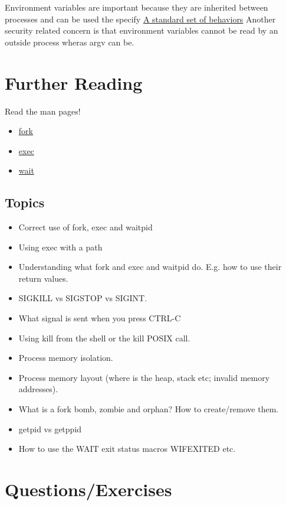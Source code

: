 Environment variables are important because they are inherited between processes and can be used the specify \href{https://pubs.opengroup.org/onlinepubs/9699919799/basedefs/V1_chap08.html}{A standard set of behaviors}
Another security related concern is that environment variables cannot be read by an outside process wheras argv can be.

\section{Further Reading}

Read the man pages! 
\begin{itemize}
\item \href{http://man7.org/linux/man-pages/man2/fork.2.html}{fork} 
\item \href{http://man7.org/linux/man-pages/man3/exec.3.html}{exec} 
\item \href{http://man7.org/linux/man-pages/man2/wait.2.html}{wait}
\end{itemize}

\subsection{Topics}

\begin{itemize}
  \tightlist
\item
  Correct use of fork, exec and waitpid
\item
  Using exec with a path
\item
  Understanding what fork and exec and waitpid do. E.g. how to use their return values.
\item
  SIGKILL vs SIGSTOP vs SIGINT.
\item
  What signal is sent when you press CTRL-C
\item
  Using kill from the shell or the kill POSIX call.
\item
  Process memory isolation.
\item
  Process memory layout (where is the heap, stack etc; invalid memory addresses).
\item
  What is a fork bomb, zombie and orphan? How to create/remove them.
\item
  getpid vs getppid
\item
  How to use the WAIT exit status macros WIFEXITED etc.
\end{itemize}

\section{Questions/Exercises}

